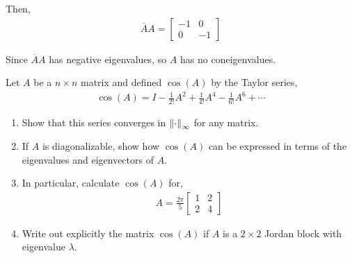\documentclass[10pt]{article}
\begin{document}
\begin{solution}[Solution]
\begin{enumerate}[label=(\alph*)]
        Then,
        \begin{align*}
            \overline{A}A = \left[\begin{array}{rr}-1 & 0 \\ 0 & -1\end{array}\right]
        \end{align*}


        Since \( \overline{A}A \) has negative eigenvalues, so \( A \) has no coneigenvalues.

\end{enumerate}
\end{solution}


\begin{problem}
    Let \( A \) be a \( n\times n \) matrix and defined \( \cos(A) \) by the Taylor series,
    \begin{align*}
        \cos(A) = I - \frac{1}{2!}A^2 + \frac{1}{4!}A^4 - \frac{1}{6!}A^6 + \cdots
    \end{align*}
    \begin{enumerate}[label=(\alph*), nolistsep]
        \item Show that this series converges in \( \left\lVert\cdot\right\rVert_\infty \) for any matrix.
        \item If \( A \) is diagonalizable, show how \( \cos(A) \) can be expressed in terms of the eigenvalues and eigenvectors of \( A \).
        \item In particular, calculate \( \cos(A) \) for,
            \begin{align*}
                A = \frac{2\pi}{5} \left[\begin{array}{cc}1 & 2 \\ 2 & 4\end{array}\right]
            \end{align*}
        \item Write out explicitly the matrix \( \cos(A) \) if \( A \) is a \( 2\times 2 \) Jordan block with eigenvalue \( \lambda \).
    \end{enumerate}
\end{problem}
\end{document}
